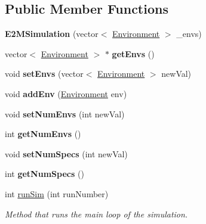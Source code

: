 \subsection*{Public Member Functions}
\begin{DoxyCompactItemize}
\item 
\hypertarget{classE2MSimulation_addbbeb65c91d569a20ddd01ff251fb05}{}\label{classE2MSimulation_addbbeb65c91d569a20ddd01ff251fb05} 
{\bfseries E2\+M\+Simulation} (vector$<$ \hyperlink{classEnvironment}{Environment} $>$ \+\_\+envs)
\item 
\hypertarget{classE2MSimulation_afbbbc3eb05c8e6a9f88c906a95c33ffd}{}\label{classE2MSimulation_afbbbc3eb05c8e6a9f88c906a95c33ffd} 
vector$<$ \hyperlink{classEnvironment}{Environment} $>$ $\ast$ {\bfseries get\+Envs} ()
\item 
\hypertarget{classE2MSimulation_a9fc625c0e66768b4b70cc2b682a3316a}{}\label{classE2MSimulation_a9fc625c0e66768b4b70cc2b682a3316a} 
void {\bfseries set\+Envs} (vector$<$ \hyperlink{classEnvironment}{Environment} $>$ new\+Val)
\item 
\hypertarget{classE2MSimulation_a3cc272d636e0ce6cec2a55cc5cd7970d}{}\label{classE2MSimulation_a3cc272d636e0ce6cec2a55cc5cd7970d} 
void {\bfseries add\+Env} (\hyperlink{classEnvironment}{Environment} env)
\item 
\hypertarget{classE2MSimulation_a433cdd06ccf6fce0636e9c05a1f6eb3a}{}\label{classE2MSimulation_a433cdd06ccf6fce0636e9c05a1f6eb3a} 
void {\bfseries set\+Num\+Envs} (int new\+Val)
\item 
\hypertarget{classE2MSimulation_a04040a96efb80654c6ab3d71c55e43df}{}\label{classE2MSimulation_a04040a96efb80654c6ab3d71c55e43df} 
int {\bfseries get\+Num\+Envs} ()
\item 
\hypertarget{classE2MSimulation_a08698e0fb7b4be7f1e9369aeeec85ca2}{}\label{classE2MSimulation_a08698e0fb7b4be7f1e9369aeeec85ca2} 
void {\bfseries set\+Num\+Specs} (int new\+Val)
\item 
\hypertarget{classE2MSimulation_a113e3427b21a4a6151026d35dc258110}{}\label{classE2MSimulation_a113e3427b21a4a6151026d35dc258110} 
int {\bfseries get\+Num\+Specs} ()
\item 
int \hyperlink{classE2MSimulation_aeac4e92c10f89a5c953ace5b1327d20b}{run\+Sim} (int run\+Number)
\begin{DoxyCompactList}\small\item\em Method that runs the main loop of the simulation. \end{DoxyCompactList}\end{DoxyCompactItemize}
